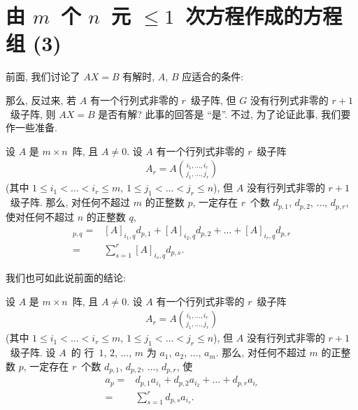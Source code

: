 \section{\texorpdfstring{由 \(m\)~个 \(n\)~元
      \({\leq} 1\)~次方程作成的方程组 (3)}%
  {由 m 个 n 元 ≤1 次方程作成的方程组 (3)}}

\maldevigalegajxo

前面, 我们讨论了
\(AX = B\) 有解时,
\(A\), \(B\) 应适合的条件:

\TheoremNecessityForConsistency*

那么, 反过来,
若 \(A\) 有一个行列式非零的 \(r\)~级子阵,
但 \(G\) 没有行列式非零的 \(r+1\)~级子阵,
则 \(AX = B\) 是否有解?
此事的回答是 ``是''.
不过, 为了论证此事,
我们要作一些准备.

\begin{theorem}
    设 \(A\) 是 \(m \times n\)~阵,
    且 \(A \neq 0\).
    设 \(A\) 有一个行列式非零的 \(r\)~级子阵
    \begin{align*}
        A_r = A\binom{i_1,\dots,i_r}{j_1,\dots,j_r}
    \end{align*}
    (其中
    \(1 \leq i_1 < \dots < i_r \leq m\),
    \(1 \leq j_1 < \dots < j_r \leq n\)),
    但 \(A\) 没有行列式非零的 \(r+1\)~级子阵.
    那么, 对任何不超过 \(m\) 的正整数 \(p\),
    一定存在 \(r\)~个数
    \(d_{p,1}\), \(d_{p,2}\), \(\dots\), \(d_{p,r}\),
    使对任何不超过 \(n\) 的正整数 \(q\),
    \begin{align*}
        [A]_{p,q}
        = {} &
        [A]_{i_1,q} d_{p,1}
        + [A]_{i_2,q} d_{p,2}
        + \dots
        + [A]_{i_r,q} d_{p,r}
        \\
        = {} &
        \sum_{s = 1}^{r} {[A]_{i_s,q} d_{p,s}}.
    \end{align*}
\end{theorem}

我们也可如此说前面的结论:

\begin{theorem}
    设 \(A\) 是 \(m \times n\)~阵,
    且 \(A \neq 0\).
    设 \(A\) 有一个行列式非零的 \(r\)~级子阵
    \begin{align*}
        A_r = A\binom{i_1,\dots,i_r}{j_1,\dots,j_r}
    \end{align*}
    (其中
    \(1 \leq i_1 < \dots < i_r \leq m\),
    \(1 \leq j_1 < \dots < j_r \leq n\)),
    但 \(A\) 没有行列式非零的 \(r+1\)~级子阵.
    设 \(A\)~的%
    行~\(1\), \(2\), \(\dots\), \(m\)
    为 \(a_1\), \(a_2\), \(\dots\), \(a_m\).
    那么, 对任何不超过 \(m\) 的正整数 \(p\),
    一定存在 \(r\)~个数
    \(d_{p,1}\), \(d_{p,2}\), \(\dots\), \(d_{p,r}\),
    使
    \begin{align*}
        a_p
        = {} &
        d_{p,1} a_{i_1}
        + d_{p,2} a_{i_2}
        + \dots
        + d_{p,r} a_{i_r}
        \\
        = {} &
        \sum_{s = 1}^{r} {d_{p,s} a_{i_s}}.
    \end{align*}
\end{theorem}

